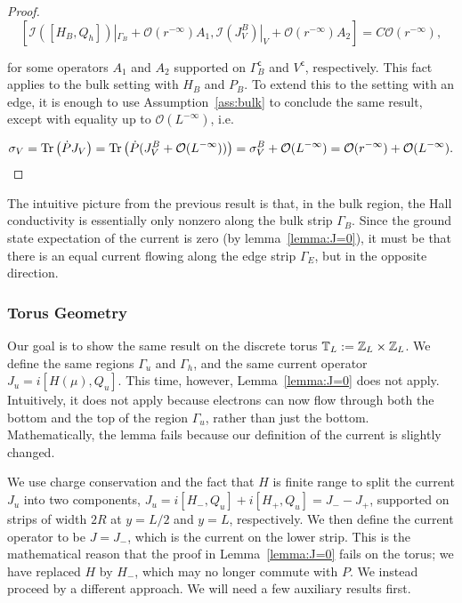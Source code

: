 \documentclass[12pt, letterpaper]{article}
\begin{document}
\begin{proof}
\[[\mathcal{I}([H_B,Q_h])|_{\Gamma_B} + \mathcal{O}(r^{-\infty}) A_1, \mathcal{I}(J_V^B)|_V + \mathcal{O}(r^{-\infty}) A_2] = C\mathcal{O}(r^{-\infty}),\]

for some operators $A_1$ and $A_2$ supported on $\Gamma_B^\mathsf{c}$ and $V^\mathsf{c}$, respectively. This fact applies to the bulk setting with $H_B$ and $P_B$. To extend this to the setting with an edge, it is enough to use Assumption~\ref{ass:bulk} to conclude the same result, except with equality up to $\mathcal{O}(L^{-\infty})$, i.e.

\[\sigma_V = \text{Tr}\left(\dot{P}J_V\right) = \text{Tr}\left(\dot{P}(J_V^B + \mathcal{O}(L^{-\infty}))\right) = \sigma_V^B + \mathcal{O}(L^{-\infty}) = \mathcal{O}(r^{-\infty}) + \mathcal{O}(L^{-\infty}).\]

\end{proof}


The intuitive picture from the previous result is that, in the bulk region, the Hall conductivity is essentially only nonzero along  the bulk strip $\Gamma_B$. Since the ground state expectation of the current is zero (by lemma~\ref{lemma:J=0}), it must be that there is an equal current flowing along the edge strip $\Gamma_E$, but in the opposite direction.

\subsubsection{Torus Geometry}

Our goal is to show the same result on the discrete torus $\mathbb{T}_L := \mathbb{Z}_L \times \mathbb{Z}_L$. We define the same regions $\Gamma_u$ and $\Gamma_h$, and the same current operator $J_u = i[H(\mu), Q_u]$. This time, however, Lemma~\ref{lemma:J=0} does not apply. Intuitively, it does not apply because electrons can now flow through both the bottom and the top of the region $\Gamma_u$, rather than just the bottom. Mathematically, the lemma fails because our definition of the current is slightly changed.

We use charge conservation and the fact that $H$ is finite range to split the current $J_u$ into two components, $J_u = i[H_-, Q_u] + i[H_+, Q_u] = J_- - J_+$, supported on strips of width $2R$ at $y=L/2$ and $y=L$, respectively. We then define the current operator to be $J=J_-$, which is the current on the lower strip. This is the mathematical reason that the proof in Lemma~\ref{lemma:J=0} fails on the torus; we have replaced $H$ by $H_-$, which may no longer commute with $P$. We instead proceed by a different approach. We will need a few auxiliary results first.
\end{document}
